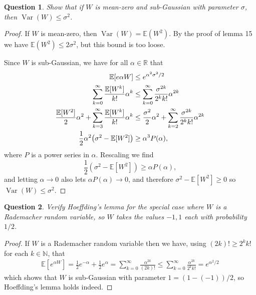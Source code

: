 \documentclass{article}
\theoremstyle{plain}
\newtheorem{question}{Question}
\theoremstyle{remark}
\newcommand{\Bb}{\mathbb}
\newcommand{\NN}{\Bb N}
\newcommand{\RR}{\Bb R}
\newcommand{\EE}{\Bb E}
\DeclareMathOperator{\Var}{Var}
\begin{document}
\begin{question}
	Show that if $W$ is mean-zero and sub-Gaussian with parameter $\sigma$, then $\Var(W) \leq \sigma^2$. 
\end{question}

\begin{proof}
	If $W$ is mean-zero, then $\Var(W) = \EE(W^2)$. By the proof of lemma 15 we have $\EE(W^2) \leq 2 \sigma^2$, but this bound is too loose.   
	
	Since $W$ is sub-Gaussian, we have for all $\alpha \in \RR$ that
	\begin{align*}
		\EE[e{\alpha W}] &\leq e^{\alpha^2\sigma^2/2} \\
		\sum_{k=0}^\infty \frac{\EE[W^k] }{k!} \alpha^k &\leq \sum_{k=0}^\infty \frac{\sigma^{2k}}{2^k k!} \alpha^{2k} \\
		\frac{\EE[W^2]}{2} \alpha^2 + \sum_{k=3}^\infty \frac{\EE[W^k]}{k!} \alpha^k &\leq \frac{\sigma^2}{2} \alpha^2 + \sum_{k=2}^\infty \frac{\sigma^{2k}}{2^k k!} \alpha^{2k} \\
		\frac12\alpha^2 \qty(\sigma^2 - \EE[W^2]) &\geq \alpha^3 P(\alpha),
		\end{align*}
	where $P$ is a power series in $\alpha$. Rescaling we find \[
	\frac12(\sigma^2 - \EE[W^2]) \geq \alpha P(\alpha),
	\]
	and letting $\alpha \to 0$ also lets $\alpha P(\alpha) \to 0$, and therefore $\sigma^2 - \EE[W^2] \geq 0$ so $\Var(W) \leq \sigma^2$. 
\end{proof}

\begin{question}
	Verify Hoeffding's lemma for the special case where $W$ is a Rademacher random variable, so $W$ takes the values $-1, 1$ each with probability $1/2$. 
\end{question}

\begin{proof}
		If $W$ is a Rademacher random variable then we have, using $(2k)! \geq 2^k k!$ for each $k \in \NN$, that
	\begin{align*}
		\EE[e^{\alpha W}] = \frac12 e^{-\alpha} + \frac12 e^{\alpha} = \sum_{k=0}^\infty \frac{\alpha^{2k}}{(2k)!} \leq \sum_{k=0}^\infty \frac{\alpha^{2k}}{2^k k!} = e^{\alpha^2/2}
	\end{align*}
which shows that $W$ is sub-Gaussian with parameter $1 = (1 -(-1))/2$, so Hoeffding's lemma holds indeed. 
\end{proof}
\end{document}

